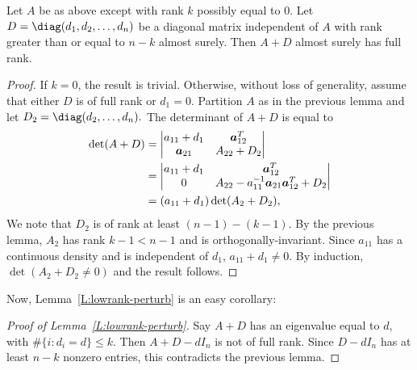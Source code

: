 \begin{lemma}
    Let $A$ be as above except with rank $k$ possibly equal to $0$.  
    Let $D = \diag(d_1, d_2, \ldots, d_n)$ be a diagonal matrix independent of
    $A$ with rank greater than or equal to $n-k$ almost surely.  Then
    $A + D$ almost surely has full rank.
\end{lemma}
\begin{proof}
    If $k = 0$, the result is trivial.  Otherwise,
    without loss of generality, assume that either $D$ is of full rank
    or $d_1 = 0$.  Partition $A$ as in the previous lemma and let 
    \(
        D_2 = \diag(d_2, \ldots, d_n).
    \)
    The determinant of $A + D$ is equal to
    \begin{align*}
        \det ( A + D )
            &= \left|
               \begin{matrix}
                   a_{11} + d_1 & \boldsymbol{a}_{12}^T \\
                   \boldsymbol{a}_{21}     & A_{22} + D_2
               \end{matrix}
               \right| \\
            &= \left|
               \begin{matrix}
                   a_{11} + d_1 & \boldsymbol{a}_{12}^T \\
                   0            & A_{22} - a_{11}^{-1} \boldsymbol{a}_{21} \boldsymbol{a}_{12}^T + D_2
               \end{matrix}
               \right| \\
            &= (a_{11} + d_1) \det (A_2 + D_2),
    \end{align*}
    We note that $D_2$ is of rank at least $(n-1) - (k-1)$. 
    By the previous lemma, $A_2$ has rank $k - 1 < n - 1$ and is
    orthogonally-invariant.  Since $a_{11}$ has a continuous density and
    is independent of $d_{1}$, $a_{11} + d_1 \neq 0$.  By induction,
    $\det (A_2 + D_2 \neq 0)$ and the result follows.
\end{proof}

Now, Lemma~\ref{L:lowrank-perturb} is an easy corollary:

\begin{proof}[Proof of Lemma~\ref{L:lowrank-perturb}]
    Say $A + D$ has an eigenvalue equal to $d$, with
    $\#\{ i : d_i = d \} \leq k$.  Then $A + D - d I_n$ is not
    of full rank.  Since $D - d I_n$ has at least $n-k$ nonzero entries,
    this contradicts the previous lemma.
\end{proof}    





